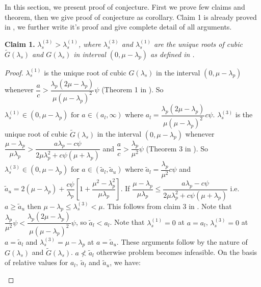 \documentclass[12pt, a4paper]{report}
\begin{document}
\label{con_proof}
In this section, we present proof of conjecture. First we prove few claims and theorem, then we give proof of conjecture as corollary. Claim 1 is already proved in \cite{Sudhir_TR}, we further write it's proof and give complete detail of all arguments. %


\textbf{Claim 1.} \textit{ $\lambda_s^{(3)} > \lambda_s^{(1)}$, where $\lambda_s^{(3)}$ and $\lambda_s^{(1)}$ are the unique roots of cubic $\tilde{G}(\lambda_s)$ and $G(\lambda_s)$ in interval $(0,\mu-\lambda_p)$ as defined in \cite{Sudhir_standard_style}.}
\begin{proof} $\lambda_s^{(1)}$ is the unique root of cubic $G(\lambda_s)$ in the interval $(0, \mu-\lambda_p)$ whenever $\dfrac{a}{c} > \dfrac{\lambda_p(2\mu-\lambda_p)}{\mu(\mu-\lambda_p)^2}\psi$ (Theorem 1 in \cite{Sudhir_standard_style}). So $\lambda_s^{(1)}\in (0,\mu-\lambda_p) \text{ for } a \in (a_l, \infty)$ where $a_l =\dfrac{\lambda_p(2\mu-\lambda_p)}{\mu(\mu-\lambda_p)^2}c\psi $. $\lambda_s^{(3)}$ is the unique root of cubic $\tilde{G}(\lambda_s)$ in the interval $(0, \mu-\lambda_p)$  whenever $\dfrac{\mu-\lambda_p}{\mu\lambda_p} > \dfrac{a\lambda_p - c\psi}{2\mu\lambda_p^2 + c\psi(\mu+\lambda_p)}$ and $\dfrac{a}{c} > \dfrac{\lambda_p}{\mu^2}\psi$ (Theorem 3 in \cite{Sudhir_standard_style}). So $\lambda_s^{(3)} \in (0,\mu-\lambda_p)$ for $a \in (\tilde{a}_l, \tilde{a}_u)$ where $\tilde{a}_l = \dfrac{\lambda_p}{\mu^2}c\psi$ and $\tilde{a}_u = 2(\mu-\lambda_p) + \dfrac{c\psi}{\lambda_p}\left[1+\dfrac{\mu^2-\lambda_p^2}{\mu\lambda_p}\right]$. If $\dfrac{\mu-\lambda_p}{\mu\lambda_p} \leq \dfrac{a\lambda_p - c\psi}{2\mu\lambda_p^2 + c\psi(\mu+\lambda_p)}$ i.e. $a \ge \tilde{a}_u$ then $\mu-\lambda_p \leq \lambda_s^{(3)} < \mu$. This follows from claim 3 in \cite{Sudhir_standard_style}. Note that $\dfrac{\lambda_p}{\mu^2}\psi <\dfrac{\lambda_p(2\mu-\lambda_p)}{\mu(\mu-\lambda_p)^2}\psi$, so $\tilde{a}_l < a_l$. Note that $\lambda_s^{(1)} = 0$ at $a = a_l$, $\lambda_s^{(3)} = 0$ at $a = \tilde{a}_l$ and $\lambda_s^{(3)} = \mu-\lambda_p$ at $a = \tilde{a}_u$. These arguments follow by the nature of $G(\lambda_s)$ and $\tilde{G}(\lambda_s)$. $a \nless \tilde{a}_l$ otherwise problem becomes infeasible. On the basis of relative values for $a_l,~\tilde{a}_l$ and $ \tilde{a}_u$, we have:
\begin{itemize}

\end{itemize}
\end{proof}
\end{document}
